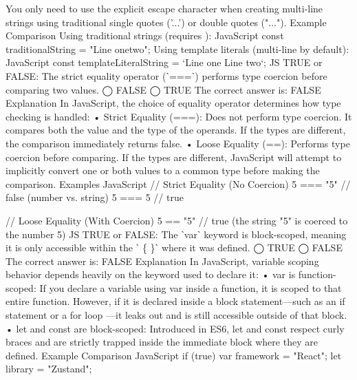 You only need to use the explicit \n escape character when creating multi-line strings using traditional single quotes ('...') or double quotes ("...").
Example Comparison
Using traditional strings (requires \n):
JavaScript
const traditionalString = "Line one\nLine two";
Using template literals (multi-line by default):
JavaScript
const templateLiteralString = `Line one
Line two`;
JS
TRUE or FALSE: The strict equality operator (ˋ===ˋ) performs type coercion before comparing two values.
◯ FALSE
◯ TRUE
The correct answer is:
FALSE
Explanation
In JavaScript, the choice of equality operator determines how type checking is handled:
•	Strict Equality (===): Does not perform type coercion. It compares both the value and the type of the operands. If the types are different, the comparison immediately returns false.
•	Loose Equality (==): Performs type coercion before comparing. If the types are different, JavaScript will attempt to implicitly convert one or both values to a common type before making the comparison.
Examples
JavaScript
// Strict Equality (No Coercion)
5 === "5" // false (number vs. string)
5 === 5   // true

// Loose Equality (With Coercion)
5 == "5"  // true (the string "5" is coerced to the number 5)
JS
TRUE or FALSE: The ˋvarˋ keyword is block-scoped, meaning it is only accessible within the ˋ \{ \}ˋ where it was defined.
◯ TRUE
◯ FALSE
The correct answer is:
FALSE
Explanation
In JavaScript, variable scoping behavior depends heavily on the keyword used to declare it:
•	var is function-scoped: If you declare a variable using var inside a function, it is scoped to that entire function. However, if it is declared inside a block statement—such as an if statement or a for loop { }—it leaks out and is still accessible outside of that block.
•	let and const are block-scoped: Introduced in ES6, let and const respect curly braces { } and are strictly trapped inside the immediate block where they are defined.
Example Comparison
JavaScript
if (true) {
  var framework = "React";
  let library = "Zustand";
}

